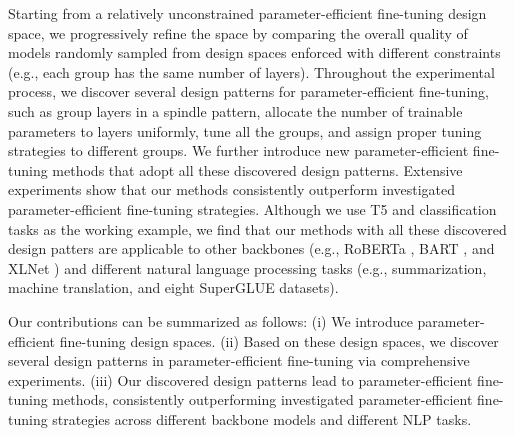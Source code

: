 Starting from a relatively unconstrained parameter-efficient fine-tuning design space, we progressively refine the space by comparing the overall quality of models randomly sampled from design spaces enforced with different constraints (e.g., each group has the same number of layers). Throughout the experimental process, we discover several design patterns for parameter-efficient fine-tuning, such as group layers in a spindle pattern, allocate the number of trainable parameters to layers uniformly, tune all the groups, and assign proper tuning strategies to different groups. We further introduce new parameter-efficient fine-tuning methods that adopt all these discovered design patterns. Extensive experiments show that our methods consistently outperform investigated parameter-efficient fine-tuning strategies. Although we use T5 \citep{raffel2020exploring} and classification tasks as the working example, we find that our methods with all these discovered design patters are applicable to other backbones (e.g., RoBERTa \citep{liu2019roberta}, BART \citep{lewis-etal-2020-bart}, and XLNet \citep{yang2019xlnet}) and different natural language processing tasks (e.g., summarization, machine translation, and eight SuperGLUE datasets). 

Our contributions can be summarized as follows: (i) We introduce parameter-efficient fine-tuning design spaces. (ii) Based on these design spaces, we discover several design patterns in parameter-efficient fine-tuning via comprehensive experiments. (iii) Our discovered design patterns lead to parameter-efficient fine-tuning methods, consistently outperforming investigated parameter-efficient fine-tuning strategies across different backbone models and different NLP tasks.

